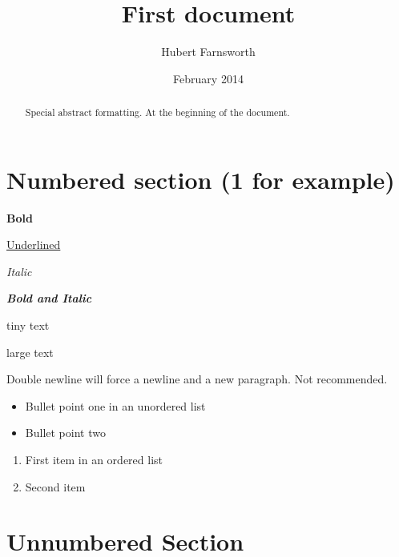 \documentclass[12pt, a4paper]{article} %
\title{First document}
\author{Hubert Farnsworth}
\date{February 2014} %
\begin{document}

\maketitle %

\tableofcontents



\begin{abstract}
Special abstract formatting. At the beginning of the document.
\end{abstract}



\section{Numbered section (1 for example)}

\textbf{Bold}

\underline{Underlined}

\textit{Italic}

\textbf{\textit{Bold and Italic}}

{\tiny tiny text}

{\LARGE large text}



Double newline will force a newline and a new paragraph. Not recommended.



\begin{itemize}
  \item Bullet point one in an unordered list
  \item Bullet point two
\end{itemize}

\begin{enumerate}
  \item First item in an ordered list
  \item Second item
\end{enumerate}



\section*{Unnumbered Section} %
\end{document}
